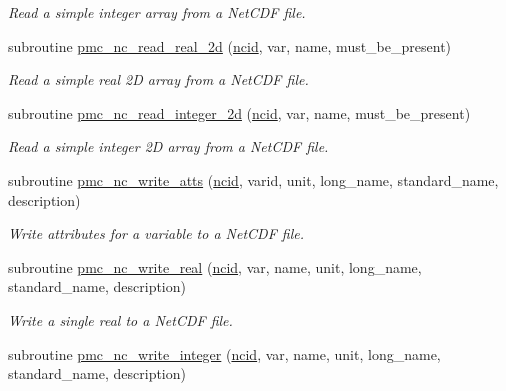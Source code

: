 \begin{DoxyCompactItemize}
\begin{DoxyCompactList}\small\item\em Read a simple integer array from a Net\+C\+DF file. \end{DoxyCompactList}\item 
subroutine \mbox{\hyperlink{namespacepmc__netcdf_a12c72b4b7438c2c715be55c435d8d1fc}{pmc\+\_\+nc\+\_\+read\+\_\+real\+\_\+2d}} (\mbox{\hyperlink{fractal_8_f90_a4e89f3f850921ff84a6dfce8b166ad50}{ncid}}, var, name, must\+\_\+be\+\_\+present)
\begin{DoxyCompactList}\small\item\em Read a simple real 2D array from a Net\+C\+DF file. \end{DoxyCompactList}\item 
subroutine \mbox{\hyperlink{namespacepmc__netcdf_a1dccd30c85af447ee1bad6bb7a6ad0ab}{pmc\+\_\+nc\+\_\+read\+\_\+integer\+\_\+2d}} (\mbox{\hyperlink{fractal_8_f90_a4e89f3f850921ff84a6dfce8b166ad50}{ncid}}, var, name, must\+\_\+be\+\_\+present)
\begin{DoxyCompactList}\small\item\em Read a simple integer 2D array from a Net\+C\+DF file. \end{DoxyCompactList}\item 
subroutine \mbox{\hyperlink{namespacepmc__netcdf_aec38f84822ec8fa3ecbed6e69a24d274}{pmc\+\_\+nc\+\_\+write\+\_\+atts}} (\mbox{\hyperlink{fractal_8_f90_a4e89f3f850921ff84a6dfce8b166ad50}{ncid}}, varid, unit, long\+\_\+name, standard\+\_\+name, description)
\begin{DoxyCompactList}\small\item\em Write attributes for a variable to a Net\+C\+DF file. \end{DoxyCompactList}\item 
subroutine \mbox{\hyperlink{namespacepmc__netcdf_ac319a94ac04f697f1c6623740101016a}{pmc\+\_\+nc\+\_\+write\+\_\+real}} (\mbox{\hyperlink{fractal_8_f90_a4e89f3f850921ff84a6dfce8b166ad50}{ncid}}, var, name, unit, long\+\_\+name, standard\+\_\+name, description)
\begin{DoxyCompactList}\small\item\em Write a single real to a Net\+C\+DF file. \end{DoxyCompactList}\item 
subroutine \mbox{\hyperlink{namespacepmc__netcdf_a4100434b6509117a5147ee13448f6df2}{pmc\+\_\+nc\+\_\+write\+\_\+integer}} (\mbox{\hyperlink{fractal_8_f90_a4e89f3f850921ff84a6dfce8b166ad50}{ncid}}, var, name, unit, long\+\_\+name, standard\+\_\+name, description)

\end{DoxyCompactItemize}
